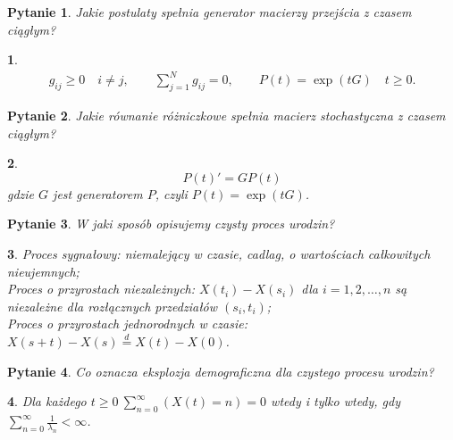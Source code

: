 \documentclass[10pt]{mwart}
\theoremstyle{plain}
\newtheorem{pytanie}{Pytanie}
\theoremstyle{break}
\newtheorem*{odpowiedź}{}
\begin{document}
\begin{pytanie}
Jakie postulaty spełnia generator macierzy przejścia z czasem ciągłym?
\end{pytanie}
\begin{odpowiedź}
    \begin{gather}
        g_{ij} \geq 0 \quad i \neq j, \qquad
        \sum_{j=1}^N g_{ij} = 0, \qquad
        P(t)=\exp(tG) \quad t\geq 0.
    \end{gather}
\end{odpowiedź}


\begin{pytanie}
Jakie równanie różniczkowe spełnia macierz stochastyczna z czasem ciągłym?
\end{pytanie}
\begin{odpowiedź}
    \begin{equation}
        P(t)' = GP(t)
    \end{equation}
    gdzie $G$ jest generatorem $P$, czyli $P(t)=\exp(tG)$.
\end{odpowiedź}


\begin{pytanie}
W jaki sposób opisujemy czysty proces urodzin?
\end{pytanie}
\begin{odpowiedź}
    Proces sygnałowy: niemalejący w czasie,
        cadlag, o wartościach całkowitych nieujemnych; \\
    Proces o przyrostach niezależnych:
        $X(t_i)-X(s_i)$ dla $i=1,2,\ldots,n$
        są niezależne dla rozłącznych przedziałów $(s_i,t_i)$; \\
    Proces o przyrostach jednorodnych w czasie:
        $X(s+t)-X(s)\overset d = X(t)-X(0)$.
\end{odpowiedź}


\begin{pytanie}
Co oznacza eksplozja demograficzna dla czystego procesu urodzin?
\end{pytanie}
\begin{odpowiedź}
    Dla każdego $t \geq 0 \ \sum\limits_{n=0}^\infty (X(t)=n)=0$ wtedy i tylko wtedy, gdy $\sum\limits_{n=0}^\infty \frac{1}{\lambda_n} < \infty$.
\end{odpowiedź}
\end{document}
